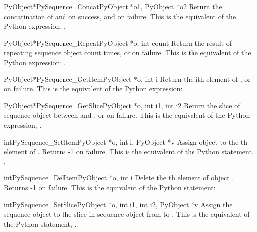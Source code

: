      \begin{cfuncdesc}{PyObject*}{PySequence_Concat}{PyObject *o1, PyObject *o2}
	 Return the concatination of  and  on success, and {\NULL} on
	 failure.   This is the equivalent of the Python
	 expression: .
     \end{cfuncdesc}


     \begin{cfuncdesc}{PyObject*}{PySequence_Repeat}{PyObject *o, int count}
	 Return the result of repeating sequence object  count times,
	 or {\NULL} on failure.  This is the equivalent of the Python
	 expression: .
     \end{cfuncdesc}


     \begin{cfuncdesc}{PyObject*}{PySequence_GetItem}{PyObject *o, int i}
	 Return the ith element of , or {\NULL} on failure. This is the
	 equivalent of the Python expression: .
     \end{cfuncdesc}


     \begin{cfuncdesc}{PyObject*}{PySequence_GetSlice}{PyObject *o, int i1, int i2}
	 Return the slice of sequence object  between  and , or
	 {\NULL} on failure. This is the equivalent of the Python
	 expression, .
     \end{cfuncdesc}


     \begin{cfuncdesc}{int}{PySequence_SetItem}{PyObject *o, int i, PyObject *v}
	 Assign object  to the th element of .
Returns -1 on failure.  This is the equivalent of the Python
	 statement, .
     \end{cfuncdesc}

     \begin{cfuncdesc}{int}{PySequence_DelItem}{PyObject *o, int i}
	 Delete the th element of object .  Returns
	 -1 on failure.  This is the equivalent of the Python
	 statement: .
     \end{cfuncdesc}

     \begin{cfuncdesc}{int}{PySequence_SetSlice}{PyObject *o, int i1, int i2, PyObject *v}
         Assign the sequence object  to the slice in sequence
	 object  from  to .  This is the equivalent of the Python
	 statement, .
     \end{cfuncdesc}


